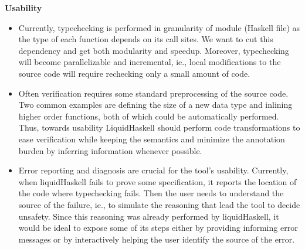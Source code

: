\textbf{Usability}
\begin{itemize}
\item Currently, typechecking is performed in granularity of module (Haskell file)
  as the type of each function depends on its call sites.
  We want to cut this dependency and get both modularity and speedup.
  Moreover, 
  typechecking will become parallelizable and incremental, ie., 
  local modifications to the source code will require rechecking
  only a small amount of code.


\item 
  Often verification requires some standard preprocessing of the source code. 
  Two common examples are 
  defining the size of a new data type and
  inlining higher order functions,
  both of which could be automatically performed.
  Thus, towards usability LiquidHaskell should perform code transformations
  to ease verification while keeping the semantics
  and minimize the annotation burden by inferring information whenever possible.
  



\item Error reporting and diagnosis are crucial for the tool's usability.
  Currently, when liquidHaskell fails to prove some specification, 
  it reports the location of the code where typechecking fails.
  Then the user needs to understand the source of the failure, 
  ie., to simulate the reasoning that lead the tool to decide unsafety.
  Since this reasoning was already performed by liquidHaskell, 
  it would be ideal
  to expose some of its steps 
  either by providing informing error messages or 
  by interactively helping the user identify the source of the error.
\end{itemize}


